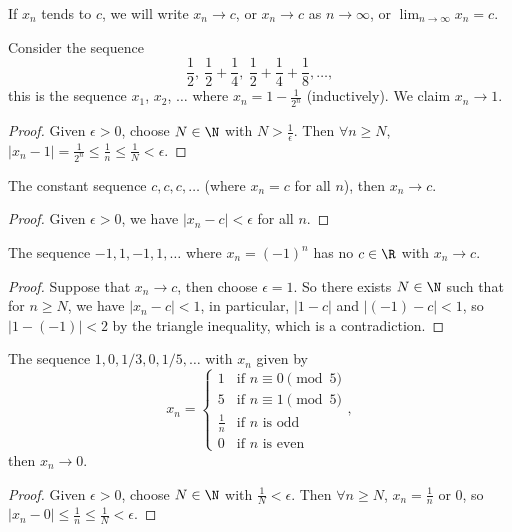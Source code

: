 \begin{notation}
	If $x_n$ tends to $c$, we will write $x_n \rightarrow c$, or $x_n \rightarrow c$ as $n \rightarrow \infty$, or $\displaystyle\lim_{n \to \infty} x_n = c$.
\end{notation}

\begin{example}
	Consider the sequence 
	$$\frac{1}{2},\ \frac{1}{2} + \frac{1}{4},\ \frac{1}{2} + \frac{1}{4} + \frac{1}{8}, \dots,$$
	this is the sequence $x_1$, $x_2$, $\dots$ where $x_n = 1 - \frac{1}{2^n}$ (inductively).
	We claim $x_n \rightarrow 1$.
\end{example}
\begin{proof}
	Given $\epsilon > 0$, choose $N \in \N$ with $N > \frac{1}{\epsilon}$. Then $\forall n \geq N$, $|x_n - 1| = \frac{1}{2^n} \leq \frac{1}{n} \leq \frac{1}{N} < \epsilon$.
\end{proof}

\begin{example}
	The constant sequence $c, c, c, \dots$ (where $x_n = c$ for all $n$), then $x_n\rightarrow c$.
\end{example}
\begin{proof}
	Given $\epsilon > 0$, we have $|x_n - c| < \epsilon$ for all $n$.
\end{proof}

\begin{example}
	The sequence $-1, 1, -1, 1, \dots$ where $x_n = (-1)^n$ has no $c \in \R$ with $x_n \rightarrow c$.
\end{example}
\begin{proof}
	Suppose that $x_n \rightarrow c$, then choose $\epsilon = 1$. So there exists $N \in \N$ such that for $n \geq N$, we have $|x_n - c| < 1$, in particular, $|1 - c|$ and $|(-1) - c| < 1$, so $|1 - (-1)| < 2$ by the triangle inequality, which is a contradiction.
\end{proof}

\begin{example}
	The sequence $1, 0, 1/3, 0, 1/5, \dots$ with $x_n$ given by
	$$
	x_n = \begin{cases}
		1 &\mbox{if } n \equiv 0 \pmod{5} \\
	   5 & \mbox{if } n \equiv 1  \pmod{5}\\ 
	   \frac{1}{n} & \mbox{if } n \text{ is odd}\\
	   0 & \mbox{if } n \text{ is even}
	   \end{cases},
	$$
	then $x_n \rightarrow 0$.
\end{example}
\begin{proof}
	Given $\epsilon > 0$, choose $N \in \N$ with $\frac{1}{N} < \epsilon$. Then $\forall n \geq N$, $x_n = \frac{1}{n}$ or 0, so $|x_n - 0| \leq \frac{1}{n} \leq \frac{1}{N} < \epsilon$.
\end{proof}


